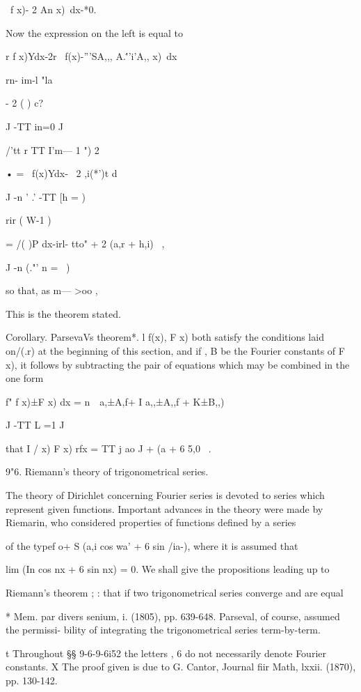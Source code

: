 \ f x)- 2 An x)\ dx-*0. 

Now the expression on the left is equal to 

r  f x)Ydx-2r \ f(x)-'''SA,,,  A.\'''i'A,, x)\ dx 

rn- im-l "la 

- 2   ( )  c?  

J -TT in=0 J 

/'tt r TT I'm— 1 ") 2 

• = \ f(x)Ydx- \ 2  ,i(*')t d  

J -n ' .' -TT [h = ) 

rir (  W-1 ) 

=   /( )P dx-irl- tto" + 2 (a,r + h,i) \ , 

J -n (."' n = \ ) 

so that, as m— >oo , 

This is the theorem stated. 

Corollary. ParsevaVs theorem*. l f(x), F x) both satisfy the conditions laid on/(.r) 
at the beginning of this section, and if   , B  be the Fourier constants of F x), it follows 
by subtracting the pair of equations which may be combined in the one form 

f"  f x)±F x)  dx = n\ \  a,±A,f+ I   a,,±A,,f +  K±B,,)  \ 

J -TT L  =1 J 

that I /  x) F  x) rfx = TT j  ao J +   (a     + 6  5,0 \ . 

9"6. Riemann's theory of trigonometrical series. 

The theory of Dirichlet concerning Fourier series is devoted to series 
which represent given functions. Important advances in the theory were 
made by Riemarin, who considered properties of functions defined by a series 

of the typef  o+ S (a,i cos wa' + 6  sin /ia-), where it is assumed that 

lim  (In cos nx + 6  sin nx) = 0. We shall give the propositions leading up to 

Riemann's theorem ; : that if two trigonometrical series converge and are equal 

* Mem. par divers senium, i. (1805), pp. 639-648. Parseval, of course, assumed the permissi- 
bility of integrating the trigonometrical series term-by-term. 

t Throughout §§ 9-6-9-6i52 the letters   , 6  do not necessarily denote Fourier constants. 
X The proof given is due to G. Cantor, Journal fiir Math, lxxii. (1870), pp. 130-142. 




